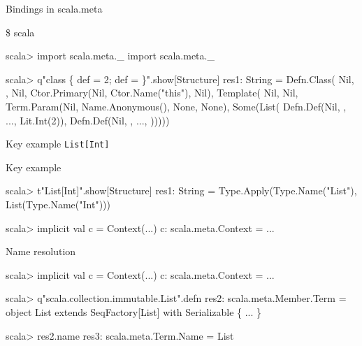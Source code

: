 \documentclass[svgnames,dvipsnames,hyperref={bookmarks=false},usepdftitle=false]{beamer}
\begin{document}
\begin{frame}[fragile]{Bindings in scala.meta}
\begin{semiverbatim}
\small
\$ scala

scala> import scala.meta.\_
import scala.meta.\_

scala> q"class \text{\color{blue}{C}} \{ def \text{\color{red}{x}} = 2; def \text{\color{LimeGreen}{y}} = \text{\color{red}{x}} \}".show[Structure]
res1: String = Defn.Class(
  Nil, \text{\color{blue}{Type.Name("C")}}, Nil,
  Ctor.Primary(Nil, Ctor.Name("this"), Nil),
  Template(
    Nil, Nil,
    Term.Param(Nil, Name.Anonymous(), None, None),
    Some(List(
      Defn.Def(Nil, \text{\color{red}{Term.Name("x")}}, ..., Lit.Int(2)),
      Defn.Def(Nil, \text{\color{LimeGreen}{Term.Name("y")}}, ..., \text{\color{red}{Term.Name("x")}})))))
\end{semiverbatim}
\end{frame}

\begin{frame}[fragile]{Key example}
\texttt{List[Int]}
\end{frame}

\begin{frame}[fragile]{Key example}
\begin{semiverbatim}
\small
scala> t"List[Int]".show[Structure]
res1: String =
Type.Apply(Type.Name("List"), List(Type.Name("Int")))

scala> implicit val c = Context(...)
c: scala.meta.Context = ...

\end{semiverbatim}
\end{frame}

\begin{frame}[fragile]{Name resolution}
\begin{semiverbatim}
scala> implicit val c = Context(...)
c: scala.meta.Context = ...

scala> q"scala.collection.immutable.List".defn
res2: scala.meta.Member.Term = object List extends
SeqFactory[List] with Serializable \{ ... \}

scala> res2.name
res3: scala.meta.Term.Name = List
\end{semiverbatim}
\end{frame}
\end{document}
